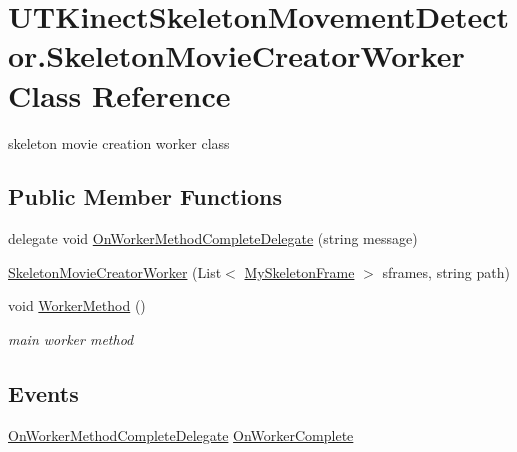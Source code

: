 \hypertarget{class_u_t_kinect_skeleton_movement_detector_1_1_skeleton_movie_creator_worker}{\section{U\-T\-Kinect\-Skeleton\-Movement\-Detector.\-Skeleton\-Movie\-Creator\-Worker Class Reference}
\label{class_u_t_kinect_skeleton_movement_detector_1_1_skeleton_movie_creator_worker}
}


skeleton movie creation worker class  


\subsection*{Public Member Functions}
\begin{DoxyCompactItemize}
\item 
delegate void \hyperlink{class_u_t_kinect_skeleton_movement_detector_1_1_skeleton_movie_creator_worker_a688da7c69b3fcbbd1cdb3b9a4cfcb1d7}{On\-Worker\-Method\-Complete\-Delegate} (string message)
\item 
\hyperlink{class_u_t_kinect_skeleton_movement_detector_1_1_skeleton_movie_creator_worker_aec611bcc2c202380be2b9f47fe846646}{Skeleton\-Movie\-Creator\-Worker} (List$<$ \hyperlink{class_u_t_kinect_skeleton_movement_detector_1_1_my_skeleton_frame}{My\-Skeleton\-Frame} $>$ sframes, string path)
\item 
void \hyperlink{class_u_t_kinect_skeleton_movement_detector_1_1_skeleton_movie_creator_worker_a15f5b8ffdfcda85af30cc0a59fc01017}{Worker\-Method} ()
\begin{DoxyCompactList}\small\item\em main worker method \end{DoxyCompactList}\end{DoxyCompactItemize}
\subsection*{Events}
\begin{DoxyCompactItemize}
\item 
\hyperlink{class_u_t_kinect_skeleton_movement_detector_1_1_skeleton_movie_creator_worker_a688da7c69b3fcbbd1cdb3b9a4cfcb1d7}{On\-Worker\-Method\-Complete\-Delegate} \hyperlink{class_u_t_kinect_skeleton_movement_detector_1_1_skeleton_movie_creator_worker_a216a708362bfed5567535e47a6124dfb}{On\-Worker\-Complete}
\end{DoxyCompactItemize}



